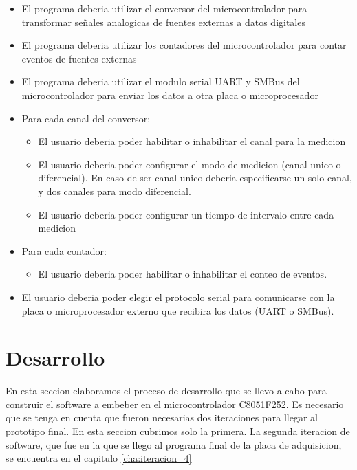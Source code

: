 \begin{itemize}
\item El programa deberia utilizar el conversor del microcontrolador para transformar señales analogicas de fuentes externas a datos digitales
\item El programa deberia utilizar los contadores del microcontrolador para contar eventos de fuentes externas
\item El programa deberia utilizar el modulo serial UART y SMBus del microcontrolador para enviar los datos a otra placa o microprocesador
\item Para cada canal del conversor:
\begin{itemize}
\item El usuario deberia poder habilitar o inhabilitar el canal para la medicion
\item El usuario deberia poder configurar el modo de medicion (canal unico o diferencial). En caso de ser canal unico deberia especificarse un solo canal, y dos canales para modo diferencial.
\item El usuario deberia poder configurar un tiempo de intervalo entre cada medicion
\end{itemize}
\item Para cada contador:
\begin{itemize}
\item El usuario deberia poder habilitar o inhabilitar el conteo de eventos.
\end{itemize}
\item El usuario deberia poder elegir el protocolo serial para comunicarse con la placa o microprocesador externo que recibira los datos (UART o SMBus).

\end{itemize}



\section{Desarrollo} %
\label{sec:desarrollo}

En esta seccion elaboramos el proceso de desarrollo que se llevo a cabo para construir el software a embeber en el microcontrolador C8051F252\cite{c8051f352}. Es necesario que se tenga en cuenta que fueron necesarias dos iteraciones para llegar al prototipo final. En esta seccion cubrimos solo la primera. La segunda iteracion de software, que fue en la que se llego al programa final de la placa de adquisicion, se encuentra en el capitulo \ref{cha:iteracion_4}

